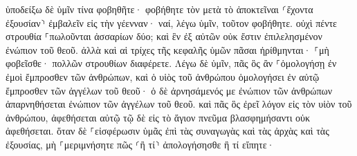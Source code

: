 \documentclass{openreader}
\begin{document}
ὑποδείξω δὲ ὑμῖν τίνα φοβηθῆτε· φοβήθητε τὸν μετὰ τὸ ἀποκτεῖναι ⸂ἔχοντα ἐξουσίαν⸃ ἐμβαλεῖν εἰς τὴν γέενναν· ναί, λέγω ὑμῖν, τοῦτον φοβήθητε. 
οὐχὶ πέντε στρουθία ⸀πωλοῦνται ἀσσαρίων δύο; καὶ ἓν ἐξ αὐτῶν οὐκ ἔστιν ἐπιλελησμένον ἐνώπιον τοῦ θεοῦ. 
ἀλλὰ καὶ αἱ τρίχες τῆς κεφαλῆς ὑμῶν πᾶσαι ἠρίθμηνται· ⸀μὴ φοβεῖσθε· πολλῶν στρουθίων διαφέρετε. 
Λέγω δὲ ὑμῖν, πᾶς ὃς ἂν ⸀ὁμολογήσῃ ἐν ἐμοὶ ἔμπροσθεν τῶν ἀνθρώπων, καὶ ὁ υἱὸς τοῦ ἀνθρώπου ὁμολογήσει ἐν αὐτῷ ἔμπροσθεν τῶν ἀγγέλων τοῦ θεοῦ· 
ὁ δὲ ἀρνησάμενός με ἐνώπιον τῶν ἀνθρώπων ἀπαρνηθήσεται ἐνώπιον τῶν ἀγγέλων τοῦ θεοῦ. 
καὶ πᾶς ὃς ἐρεῖ λόγον εἰς τὸν υἱὸν τοῦ ἀνθρώπου, ἀφεθήσεται αὐτῷ τῷ δὲ εἰς τὸ ἅγιον πνεῦμα βλασφημήσαντι οὐκ ἀφεθήσεται. 
ὅταν δὲ ⸀εἰσφέρωσιν ὑμᾶς ἐπὶ τὰς συναγωγὰς καὶ τὰς ἀρχὰς καὶ τὰς ἐξουσίας, μὴ ⸀μεριμνήσητε πῶς ⸂ἢ τί⸃ ἀπολογήσησθε ἢ τί εἴπητε· 
\end{document}
